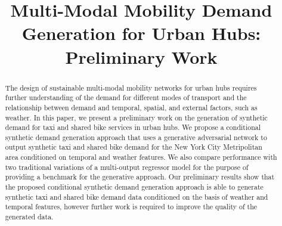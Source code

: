\documentclass[conference]{IEEEtran}
\begin{document}

\title{Multi-Modal Mobility Demand Generation for Urban Hubs: Preliminary Work
}

\author{
\and
{}
\and
{}
\and
{}
}

\maketitle

\begin{abstract}
The design of sustainable multi-modal mobility networks for urban hubs requires further understanding
of the demand for different modes of transport and the relationship between demand and temporal, spatial, and
external factors, such as weather. 
In this paper, we present a preliminary work on the
generation of synthetic demand for taxi and shared bike services in urban hubs. We propose a
conditional synthetic demand generation approach that uses a generative adversarial network to
output synthetic taxi and shared bike demand for the New York City Metripolitan area
conditioned on temporal and weather features. We also compare performance with two traditional variations 
of a multi-output regressor model for the purpose of providing a benchmark for the generative approach.
Our preliminary results show that the proposed 
conditional synthetic demand generation approach is able to generate synthetic taxi and shared bike
demand data conditioned on the basis of weather and temporal features, however further work is
required to improve the quality of the generated data.
\end{abstract}
\end{document}

